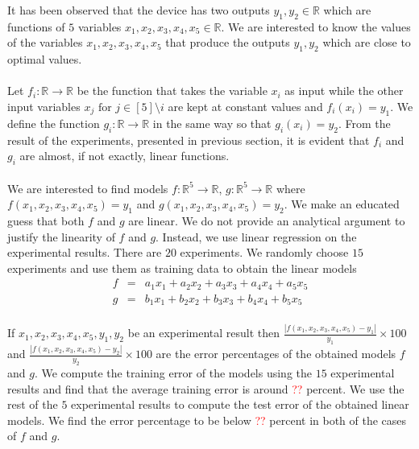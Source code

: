 \documentclass[12pt]{article}
\begin{document}
\maketitle

It has been observed that the device has two outputs $y_1,y_2 \in \mathbb{R}$ which are functions of $5$ variables $x_1,x_2,x_3,x_4,x_5 \in \mathbb{R}$. We are interested to know the values of the variables  $x_1,x_2,x_3,x_4,x_5$ that produce the outputs $y_1,y_2$ which are close to optimal values.
\paragraph{}
Let $f_i:\mathbb{R} \rightarrow \mathbb{R}$ be the function that takes the variable $x_i$ as input while the other input variables $x_{j} \text{ for } j \in [5]\setminus{i}$ are kept at constant values and $f_i(x_i) = y_1$. We define the function $g_i:\mathbb{R} \rightarrow \mathbb{R}$ in the same way so that $g_i(x_i) = y_2$. From the result of the experiments, presented in previous section, it is evident that $f_i$ and  $g_i$ are almost, if not exactly, linear functions.
\paragraph{}
We are interested to find models $f:\mathbb{R}^5 \rightarrow \mathbb{R}$, $g:\mathbb{R}^5 \rightarrow \mathbb{R}$ where $f(x_1,x_2,x_3,x_4,x_5) = y_1$ and $g(x_1,x_2,x_3,x_4,x_5) = y_2$. We make an educated guess that both $f$ and $g$ are linear. We do not provide an analytical argument to justify the linearity of $f$ and $g$. Instead, we use linear regression on the experimental results. There are $20$ experiments. We randomly choose $15$ experiments and use them as training data to obtain the linear models
\begin{eqnarray*}
f &=& a_1x_1 + a_2x_2 + a_3x_3 + a_4x_4 + a_5x_5\\
g &=& b_1x_1 + b_2x_2 + b_3x_3 + b_4x_4 + b_5x_5
\end{eqnarray*}
\paragraph{}
If $x_1,x_2,x_3,x_4,x_5,y_1,y_2$ be an experimental result then $\frac{|f(x_1,x_2,x_3,x_4,x_5)-y_1|}{y_1} \times 100$ and $\frac{|f(x_1,x_2,x_3,x_4,x_5)-y_2|}{y_2}\times 100$ are the error percentages of the obtained models $f$ and $g$. We compute the training error of the models using the $15$ experimental results and find that the average training error is around \textcolor{red}{??} percent.  We use the rest of the $5$ experimental results to compute the test error of the obtained linear models. We find the error percentage to be below \textcolor{red}{??} percent in both of the cases of $f$ and $g$.
\end{document}
